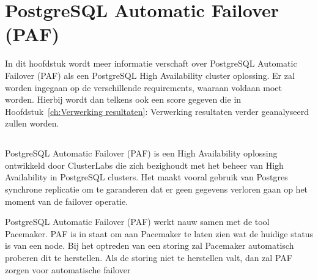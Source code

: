 
\chapter{PostgreSQL Automatic Failover (PAF)}
\label{ch:PostgreSQL Automatic Failover (PAF)}

In dit hoofdstuk wordt meer informatie verschaft over PostgreSQL Automatic Failover (PAF) als een PostgreSQL High Availability cluster oplossing. Er zal worden ingegaan op de verschillende requirements, waaraan voldaan moet worden. Hierbij wordt dan telkens ook een score gegeven die in Hoofdstuk~\ref{ch:Verwerking resultaten}: Verwerking resultaten verder geanalyseerd zullen worden.



\section{}
\label{sec:Inleiding tot PostgreSQL Automatic Failover (PAF)}

PostgreSQL Automatic Failover (PAF) is een High Availability oplossing ontwikkeld door ClusterLabs die zich bezighoudt met het beheer van High Availability in PostgreSQL clusters. Het maakt vooral gebruik van Postgres synchrone replicatie om te garanderen dat er geen gegevens verloren gaan op het moment van de failover operatie. 

PostgreSQL Automatic Failover (PAF) werkt nauw samen met de tool Pacemaker. PAF is in staat om aan Pacemaker te laten zien wat de huidige status is van een node. Bij het optreden van een storing zal Pacemaker automatisch proberen dit te herstellen.
Als de storing niet te herstellen valt, dan zal PAF zorgen voor automatische failover

